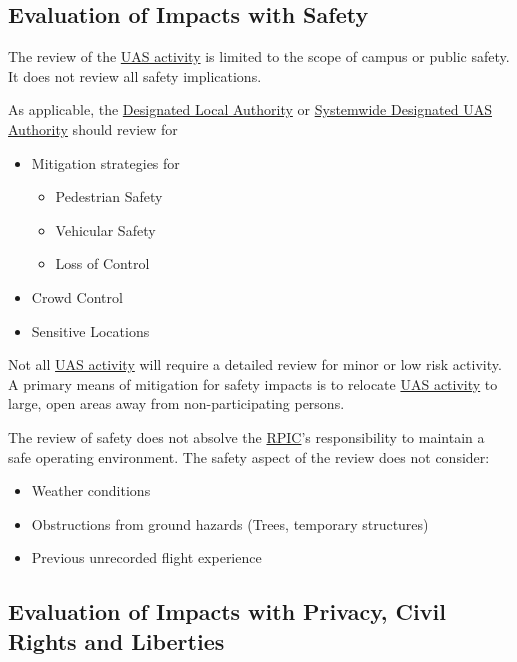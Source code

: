 \documentclass[
]{book}
\providecommand{\tightlist}{%
  \setlength{\itemsep}{0pt}\setlength{\parskip}{0pt}}
\begin{document}
\hypertarget{ss-safety}{%
\subsection{Evaluation of Impacts with Safety}\label{ss-safety}}

The review of the \protect\hyperlink{UASactivity}{UAS activity} is limited to the scope of campus or public safety. It does not review all safety implications.

As applicable, the \protect\hyperlink{DLA}{Designated Local Authority} or \protect\hyperlink{SDA}{Systemwide Designated UAS Authority} should review for

\begin{itemize}
\item
  Mitigation strategies for

  \begin{itemize}
  \tightlist
  \item
    Pedestrian Safety
  \item
    Vehicular Safety
  \item
    Loss of Control
  \end{itemize}
\item
  Crowd Control
\item
  Sensitive Locations
\end{itemize}

Not all \protect\hyperlink{UASactivity}{UAS activity} will require a detailed review for minor or low risk activity. A primary means of mitigation for safety impacts is to relocate \protect\hyperlink{UASactivity}{UAS activity} to large, open areas away from non-participating persons.

The review of safety does not absolve the \protect\hyperlink{RPIC}{RPIC}'s responsibility to maintain a safe operating environment. The safety aspect of the review does not consider:

\begin{itemize}
\tightlist
\item
  Weather conditions
\item
  Obstructions from ground hazards (Trees, temporary structures)
\item
  Previous unrecorded flight experience
\end{itemize}

\hypertarget{ss-privacy}{%
\subsection{Evaluation of Impacts with Privacy, Civil Rights and Liberties}\label{ss-privacy}}
\end{document}
